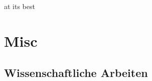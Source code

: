\documentclass{beamer}
\begin{document}
\begin{frame}[containsverbatim]{\TikZ{} at its best}
		\end{frame}
		
		
%		

		\section{Misc}
		\subsection{Wissenschaftliche Arbeiten}
	
\end{document}
